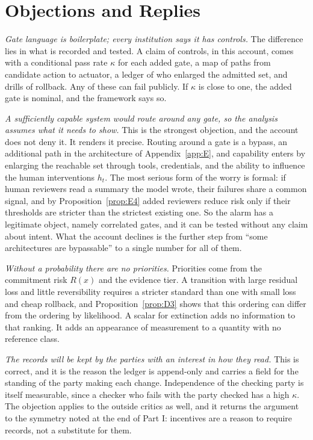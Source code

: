 \documentclass[11pt]{article}
\theoremstyle{definition}
\begin{document}
\section{Objections and Replies}

\emph{Gate language is boilerplate; every institution says it has controls.} The difference lies in what is recorded and tested. A claim of controls, in this account, comes with a conditional pass rate $\kappa$ for each added gate, a map of paths from candidate action to actuator, a ledger of who enlarged the admitted set, and drills of rollback. Any of these can fail publicly. If $\kappa$ is close to one, the added gate is nominal, and the framework says so.

\emph{A sufficiently capable system would route around any gate, so the analysis assumes what it needs to show.} This is the strongest objection, and the account does not deny it. It renders it precise. Routing around a gate is a bypass, an additional path in the architecture of Appendix~\ref{app:E}, and capability enters by enlarging the reachable set through tools, credentials, and the ability to influence the human interventions $h_t$. The most serious form of the worry is formal: if human reviewers read a summary the model wrote, their failures share a common signal, and by Proposition~\ref{prop:E4} added reviewers reduce risk only if their thresholds are stricter than the strictest existing one. So the alarm has a legitimate object, namely correlated gates, and it can be tested without any claim about intent. What the account declines is the further step from ``some architectures are bypassable'' to a single number for all of them.

\emph{Without a probability there are no priorities.} Priorities come from the commitment risk $R(x)$ and the evidence tier. A transition with large residual loss and little reversibility requires a stricter standard than one with small loss and cheap rollback, and Proposition~\ref{prop:D3} shows that this ordering can differ from the ordering by likelihood. A scalar for extinction adds no information to that ranking. It adds an appearance of measurement to a quantity with no reference class.

\emph{The records will be kept by the parties with an interest in how they read.} This is correct, and it is the reason the ledger is append-only and carries a field for the standing of the party making each change. Independence of the checking party is itself measurable, since a checker who fails with the party checked has a high $\kappa$. The objection applies to the outside critics as well, and it returns the argument to the symmetry noted at the end of Part I: incentives are a reason to require records, not a substitute for them.
\end{document}
